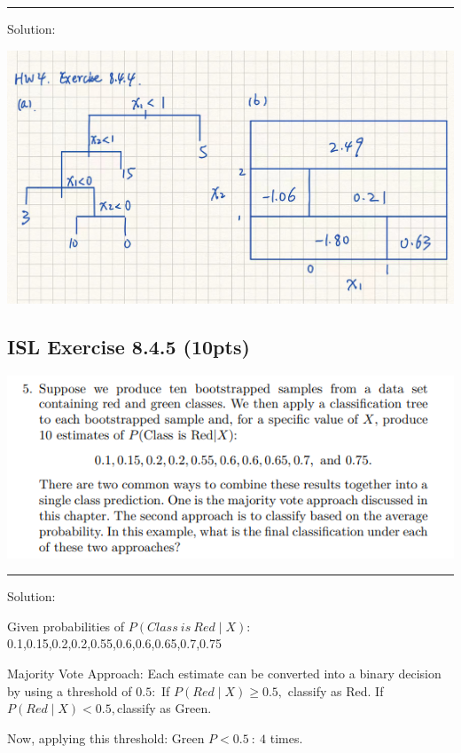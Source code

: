 \documentclass[
]{article}
\begin{document}
\begin{center}\rule{0.5\linewidth}{0.5pt}\end{center}

Solution:

\includegraphics{images/clipboard-721214745.jpeg}

\hypertarget{isl-exercise-8.4.5-10pts}{%
\subsection{ISL Exercise 8.4.5 (10pts)}\label{isl-exercise-8.4.5-10pts}}

\includegraphics{images/clipboard-946799181.png}

\begin{center}\rule{0.5\linewidth}{0.5pt}\end{center}

Solution:

Given probabilities of \(P(Class\ is\ Red∣X)\):
0.1,0.15,0.2,0.2,0.55,0.6,0.6,0.65,0.7,0.75

Majority Vote Approach: Each estimate can be converted into a binary
decision by using a threshold of \(0.5:\) If \(P(Red∣X)≥0.5,\) classify
as Red. If \(P(Red∣X)<0.5,\)classify as Green.

Now, applying this threshold: Green \(P<0.5\ :\ 4\) times.
\end{document}
